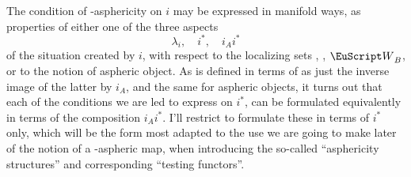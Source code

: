 The condition of \scrW-asphericity on $i$ may be expressed in manifold
ways, as properties of either one of the three aspects
\[\lambda_i, \quad i^*, \quad i_Ai^*\]
of the situation created by $i$, with respect to the localizing sets
\scrW, \scrWA, $\scrW_B$, or to the notion of aspheric object. As
\scrWA{} is defined in terms of \scrW{} as just the inverse image of
the latter by $i_A$, and the same for aspheric objects, it turns out
that each of the conditions we are led to express on
$i^*$, can be formulated equivalently in terms of the composition
$i_Ai^*$. I'll restrict to formulate these in terms of $i^*$ only,
which will be the form most adapted to the use we are going to make
later of the notion of a \scrW-aspheric map, when introducing the
so-called ``asphericity structures'' and corresponding ``testing
functors''.

\bigbreak
\noindent\hfill{}\par

